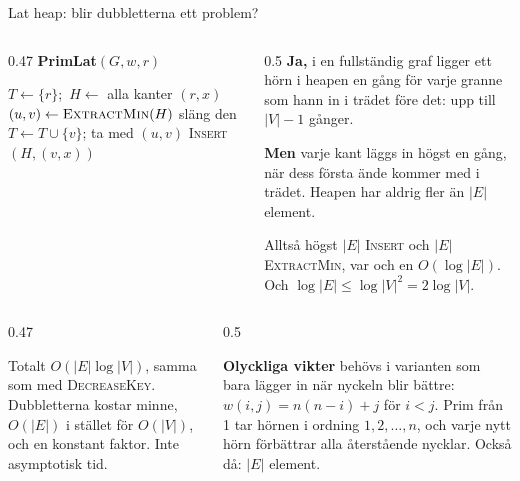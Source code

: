 {\kaninbg
\begin{frame}{\kh Lat heap: blir dubbletterna ett problem?}
\begin{columns}[T]
\begin{column}{0.47\textwidth}
{\small\bfseries\color{kthnavy}PrimLat$(G,w,r)$}
\footnotesize
\begin{algorithmic}[1]
\State $T\gets\{r\}$;\ $H\gets$ alla kanter $(r,x)$
  \State $(u,v)\gets\textsc{ExtractMin}(H)$
    \State släng den 
  \Else
    \State $T\gets T\cup\{v\}$; ta med $(u,v)$
      \State \textsc{Insert}$(H,(v,x))$
    \EndFor
  \EndIf
\EndWhile
\end{algorithmic}
\end{column}
\begin{column}{0.5\textwidth}
\footnotesize
\textbf{Ja,} i en fullständig graf ligger ett hörn i heapen en gång för varje granne som hann in
i trädet före det: upp till $|V|-1$ gånger.\par\medskip
\textbf{Men} varje kant läggs in högst en gång, när dess första ände kommer med i trädet. Heapen
har aldrig fler än $|E|$ element.\par\medskip
Alltså högst $|E|$ \textsc{Insert} och $|E|$ \textsc{ExtractMin}, var och en $O(\log|E|)$.
Och $\log|E|\le\log|V|^2=2\log|V|$.
\end{column}
\end{columns}
\vfill
\begin{columns}[T]
\begin{column}{0.47\textwidth}
\begin{ahabox}[fontupper=\footnotesize]
Totalt $O(|E|\log|V|)$, samma som med \textsc{DecreaseKey}. Dubbletterna kostar minne,
$O(|E|)$ i stället för $O(|V|)$, och en konstant faktor. Inte asymptotisk tid.
\end{ahabox}
\end{column}
\begin{column}{0.5\textwidth}
\begin{kaninbox}[fontupper=\footnotesize]
\textbf{Olyckliga vikter} behövs i varianten som bara lägger in när nyckeln blir bättre:
$w(i,j)=n(n-i)+j$ för $i<j$. Prim från 1 tar hörnen i ordning $1,2,\dots,n$, och varje nytt hörn
förbättrar alla återstående nycklar. Också då: $|E|$ element.
\end{kaninbox}
\end{column}
\end{columns}
\end{frame}}

